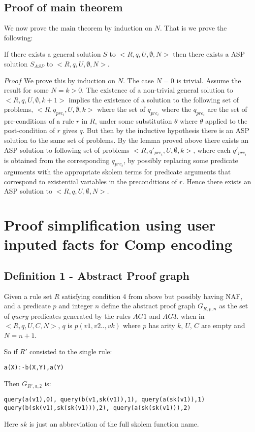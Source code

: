 \documentclass{article}
\begin{document}
\subsection{Proof of main theorem}
We now prove the main theorem by induction on $N$. That is we prove the following:\\
\begin{theorem}[Completeness]\label{completeness}If there exists a general solution $S$ to $<R,q,U,\emptyset,N>$ then there exists a ASP solution $S_{ASP}$ to $<R,q,U,\emptyset,N>$.
\end{theorem}
$Proof$ We prove this by induction on $N$. The case $N=0$ is trivial. Assume the result for some $N=k>0$. The existence of a non-trivial general solution to $<R,q,U,\emptyset,k+1>$ implies the existence of a solution to the following set of problems, $<R,q_{pre_{i}},U,\emptyset,k>$ where the set of $q_{pre_{i}}$ where the $q_{pre_{i}}$ are the set of pre-conditions of a rule $r$ in $R$, under some substitution $\theta$ where $\theta$ applied to the post-condition of $r$ gives $q$. But then by the inductive hypothesis there is an ASP solution to the same set of problems. By the lemma proved above there exists an ASP solution to following set of problems $<R,q'_{pre_{i}},U,\emptyset,k>$, where each $q'_{pre_{i}}$ is obtained from the corresponding $q_{pre_{i}}$, by possibly replacing some predicate arguments with the appropriate skolem terms for predicate arguments that correspond to existential variables in the preconditions of $r$. Hence there exists an ASP solution to $<R,q,U,\emptyset,N>$.

\section{Proof simplification using user inputed facts for Comp encoding}\label{sec:proof_simplification}
\subsection{Definition 1 - Abstract Proof graph}
Given a rule set $R$ satisfying condition 4 from above but possibly having NAF, and a predicate $p$ and integer $n$ define the abstract proof graph $G_{R,p,n}$ as the set of $query$ predicates generated by the rules $AG1$ and $AG3$. when in $<R,q,U,C,N>$, $q$ is $p(v1,v2..,vk)$ where $p$ has arity $k$, $U$, $C$ are empty and $N = n+1$. 

So if $R'$ consisted to the single rule:
\begin{verbatim}
a(X):-b(X,Y),a(Y)
\end{verbatim}
Then $G_{R',a,2}$ is: \begin{verbatim}
query(a(v1),0), query(b(v1,sk(v1)),1), query(a(sk(v1)),1)
query(b(sk(v1),sk(sk(v1))),2), query(a(sk(sk(v1))),2) \end{verbatim}
Here $sk$ is just an abbreviation of the full skolem function name. 
\end{document}

